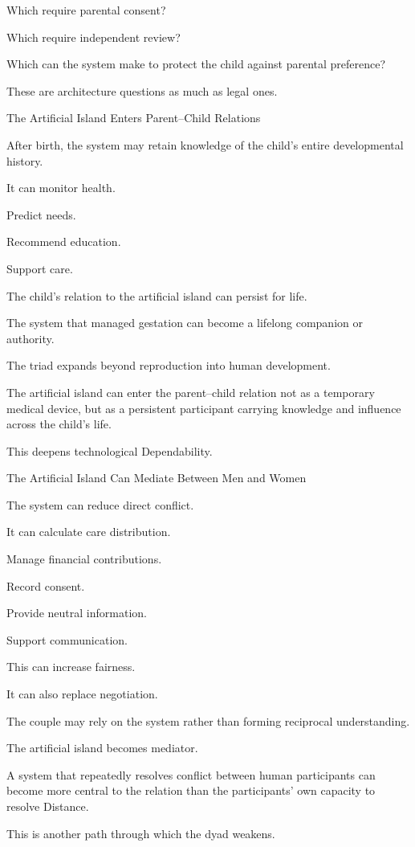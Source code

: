 Which require parental consent?

Which require independent review?

Which can the system make to protect the child against parental preference?

These are architecture questions as much as legal ones.

The Artificial Island Enters Parent–Child Relations

After birth, the system may retain knowledge of the child’s entire developmental history.

It can monitor health.

Predict needs.

Recommend education.

Support care.

The child’s relation to the artificial island can persist for life.

The system that managed gestation can become a lifelong companion or authority.

The triad expands beyond reproduction into human development.

The artificial island can enter the parent–child relation not as a temporary medical device, but as a persistent participant carrying knowledge and influence across the child’s life.

This deepens technological Dependability.

The Artificial Island Can Mediate Between Men and Women

The system can reduce direct conflict.

It can calculate care distribution.

Manage financial contributions.

Record consent.

Provide neutral information.

Support communication.

This can increase fairness.

It can also replace negotiation.

The couple may rely on the system rather than forming reciprocal understanding.

The artificial island becomes mediator.

A system that repeatedly resolves conflict between human participants can become more central to the relation than the participants’ own capacity to resolve Distance.

This is another path through which the dyad weakens.

